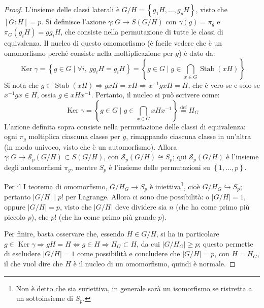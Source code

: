 \documentclass[11pt]{article}
\theoremstyle{style}
\numberwithin{equation}{subsection}
\begin{document}
	\begin{proof}
		L'insieme delle classi laterali \`e $G / H = \left\{ g_1H , \ldots, g_p H \right\} $, visto che $[G:H] = p$.
		Si definisce l'azione $\gamma: G \to S(G / H)$ con $\gamma(g) = \pi _g$ e $\pi_G (g_i H) = gg_i H$, che consiste nella permutazione di tutte le classi di equivalenza.
		Il nucleo di questo omomorfismo (\`e facile vedere che \`e un omomorfismo perch\'e consiste nella moltiplicazione per $g$) \`e dato da:
		\[
			\operatorname{Ker} \gamma = \left\{ g \in  G  \mid \forall i, \ g g_{i} H = g_i H \right\} = \left\{ g \in  G  \mid g \in \bigcap _{x \in G} \operatorname{Stab} (xH) \right\} 
		\] 
		Si nota che $g \in \operatorname{Stab} (xH) \Rightarrow gx H = xH \Rightarrow x^{-1}gx H = H$, che \`e vero se e solo se $x^{-1}g x \in H$, ossia $g \in  x H x^{-1}$.
		Pertanto, il nucleo si pu\`o scrivere come:
		\[
		\operatorname{Ker} \gamma = \left\{ g \in  G  \mid g \in \bigcap_{x \in  G}  xH x^{-1}  \right\} \overset{\text{def}}{=}H_G
		\] 
		L'azione definita sopra consiste nella permutazione delle classi di equivalenza: ogni $\pi_g$ moltiplica ciascuna classe per $g$, rimappando ciascuna classe in un'altra (in modo univoco, visto che \`e un automorfismo). 
		Allora $\gamma : G \to \mathcal{S} _p (G / H) \subset S(G/H)$, con $\mathcal{S}_p (G / H) \cong S_p$; qui $\mathcal{S}_p(G / H) $ \`e l'insieme degli automorfismi $\pi_g$, mentre $S_p$ \`e l'insieme delle permutazioni su $\left\{ 1, \ldots, p  \right\} $.

		Per il I teorema di omomorfismo, $G / H_G \longrightarrow S_p$ \`e iniettiva\footnote{Non \`e detto che sia suriettiva, in generale sar\`a un isomorfismo se ristretta a un sottoinsieme di $S_p$.}, cio\`e $G / H_G \hookrightarrow S_p$; pertanto $\lvert G / H \rvert  \mid p !$ per Lagrange.
		Allora ci sono due possibilit\`a: o $\lvert G / H \rvert  =1 $, oppure $\lvert G / H \rvert = p$, visto che $\lvert G / H \rvert $ deve dividere sia $n$ (che ha come primo pi\`u piccolo $p$), che $p!$ (che ha come primo pi\`u grande $p$).

		Per finire, basta osservare che, essendo $H \in G / H$, si ha in particolare $g \in \operatorname{Ker} \gamma\Rightarrow gH = H \iff g \in  H \Rightarrow  H_G \subset H$, da cui $\lvert G / H_G \rvert\ge p $; questo permette di escludere $\lvert G / H \rvert  =1$ come possibilit\`a e concludere che $\lvert G / H \rvert = p$, con $H = H_G$, il che vuol dire che $H$ \`e il nucleo di un omomorfismo, quindi \`e normale.
	\end{proof}
\end{document}
